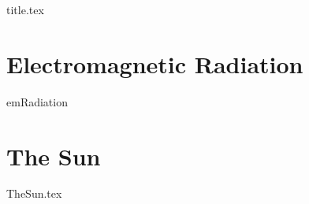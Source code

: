 \documentclass[crop=false,parskip=half]{scrartcl}
\begin{document}
{title.tex}

\tableofcontents

\section{Electromagnetic Radiation}\label{sec:emRadiation}
{emRadiation}
\section{The Sun}
{TheSun.tex}


\printbibliography
\end{document}
